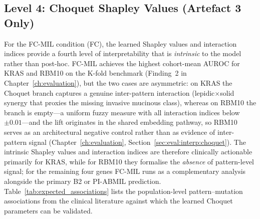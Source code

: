 \subsection{Level 4: Choquet Shapley Values (Artefact 3 Only)}
\label{sec:meth:interp:choquet_shapley}

For the FC-MIL condition (FC), the learned Shapley values and
interaction indices provide a fourth level of interpretability that is
\emph{intrinsic} to the model rather than post-hoc.
FC-MIL achieves the highest cohort-mean AUROC for KRAS and RBM10
on the K-fold benchmark (Finding~2 in Chapter~\ref{ch:evaluation}),
but the two cases are asymmetric: on KRAS the Choquet branch
captures a genuine inter-pattern interaction
(lepidic$\times$solid synergy that proxies the missing invasive
mucinous class), whereas on RBM10 the branch is empty---a uniform
fuzzy measure with all interaction indices below $\pm 0.01$---and
the lift originates in the shared embedding pathway, so RBM10
serves as an architectural negative control rather than as evidence
of inter-pattern signal (Chapter~\ref{ch:evaluation},
Section~\ref{sec:eval:interp:choquet}).
The intrinsic Shapley values and interaction indices are therefore
clinically actionable primarily for KRAS, while for RBM10 they
formalise the \emph{absence} of pattern-level signal; for the
remaining four genes FC-MIL runs as a complementary analysis
alongside the primary B2 or PI-ABMIL prediction.
Table~\ref{tab:expected_associations} lists the population-level
pattern--mutation associations from the clinical literature against
which the learned Choquet parameters can be validated.

